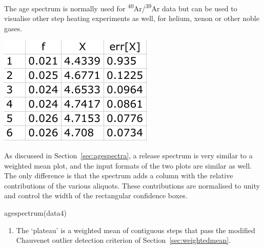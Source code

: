 \begin{refsection}
The age spectrum is normally used for
\textsuperscript{40}Ar/\textsuperscript{39}Ar data but can be used to
visualise other step heating experiments as well, for helium, xenon or
other noble gases.\\

\noindent\begin{minipage}[t]{.28\linewidth}
  \strut\vspace*{-\baselineskip}\newline
  \includegraphics[width=\linewidth]{../figures/OtherAgeSpectrumData.png}\\
\end{minipage}
\begin{minipage}[t]{.72\linewidth}
  As discussed in Section~\ref{sec:agespectra}, a release spectrum is
  very similar to a weighted mean plot, and the input formats of the
  two plots are similar as well. The only difference is that the
  spectrum adds a column with the relative contributions of the
  various aliquots. These contributions are normalised to unity and
  control the width of the rectangular confidence boxes.\\
\end{minipage}

\begin{console}
agespectrum(data4)
\end{console}

\begin{enumerate}

\item The `plateau' is a weighted mean of contiguous steps that pass
  the modified Chauvenet outlier detection criterion of
  Section~\ref{sec:weightedmean}.


\end{enumerate}
\end{refsection}
